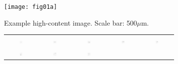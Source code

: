 \begin{figure}%
	\centering
	\begin{subfigure}{\textwidth}
		\centering
		\texttt{[image: fig01a]}
		\vspace{-0.5em}
		\caption{Example high-content image. Scale bar: 500$\mu$m.}
		\vspace{1em}
	\end{subfigure}
	\begin{subfigure}{\textwidth}
		\centering
		\begin{tabular}{c@{\,}c@{\,}c@{\,}c@{\,}c@{}}
			\includegraphics[width=0.1\textwidth]{fig01b01} &
			\includegraphics[width=0.1\textwidth]{fig01b02} &
			\includegraphics[width=0.1\textwidth]{fig01b03} &
			\includegraphics[width=0.1\textwidth]{fig01b04} &
			\includegraphics[width=0.1\textwidth]{fig01b05} \\
			\includegraphics[width=0.1\textwidth]{fig01b06} &
			\includegraphics[width=0.1\textwidth]{fig01b07} &
			\includegraphics[width=0.1\textwidth]{fig01b08} &

\end{tabular}
\end{subfigure}
\end{figure}
